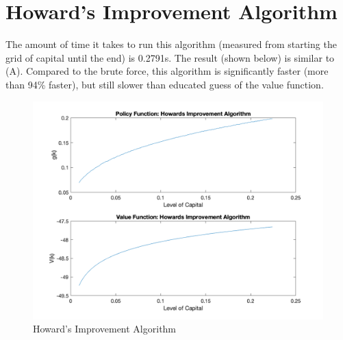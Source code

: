\documentclass[letter,10.5pt]{article}
\begin{document}
\section{Howard's Improvement Algorithm}
The amount of time it takes to run this algorithm (measured from starting the grid of capital until the end) is 0.2791s. The result (shown below) is similar to (A). Compared to the brute force, this algorithm is significantly faster (more than 94\% faster), but still slower than educated guess of the value function.
\begin{figure}[hbtp]
\centering
\caption{Howard's Improvement Algorithm}
\includegraphics[scale=0.27]{part_f.png}
\end{figure}
\end{document}
